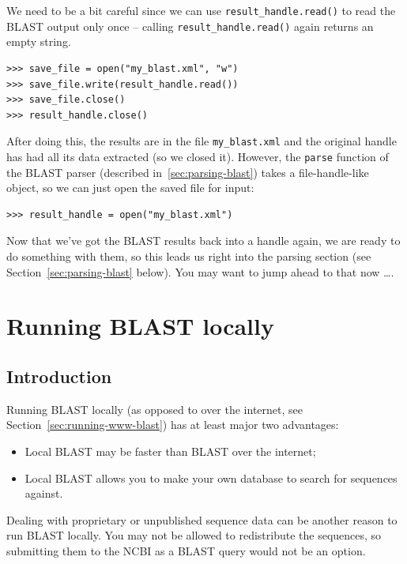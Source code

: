 \documentclass{report}
\begin{document}
\label{sec:saving-blast-output}

We need to be a bit careful since we can use \verb|result_handle.read()| to
read the BLAST output only once -- calling \verb|result_handle.read()| again
returns an empty string.

\begin{verbatim}
>>> save_file = open("my_blast.xml", "w")
>>> save_file.write(result_handle.read())
>>> save_file.close()
>>> result_handle.close()
\end{verbatim}

After doing this, the results are in the file \verb|my_blast.xml| and the
original handle has had all its data extracted (so we closed it). However,
the \verb|parse| function of the BLAST parser (described
in~\ref{sec:parsing-blast}) takes a file-handle-like object, so
we can just open the saved file for input:

\begin{verbatim}
>>> result_handle = open("my_blast.xml")
\end{verbatim}

Now that we've got the BLAST results back into a handle again, we are ready
to do something with them, so this leads us right into the parsing section
(see Section~\ref{sec:parsing-blast} below). You may want to jump ahead to
that now \ldots.

\section{Running BLAST locally}
\label{sec:running-local-blast}

\subsection{Introduction}

Running BLAST locally (as opposed to over the internet, see
Section~\ref{sec:running-www-blast}) has at least major two advantages:
\begin{itemize}
\item Local BLAST may be faster than BLAST over the internet;
\item Local BLAST allows you to make your own database to search for sequences against.
\end{itemize}
Dealing with proprietary or unpublished sequence data can be another reason to run BLAST
locally.  You may not be allowed to redistribute the sequences, so submitting them to the
NCBI as a BLAST query would not be an option.
\end{document}

